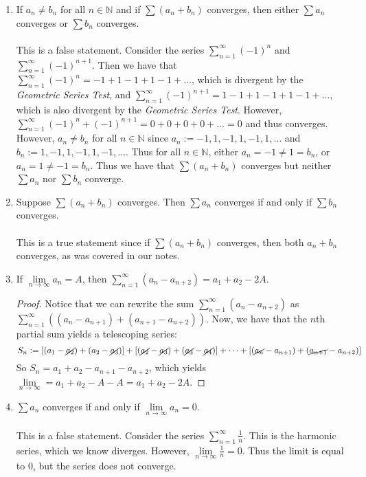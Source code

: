 \documentclass[12pt,letterpaper]{article}
\newcommand{\limx}[2]{\displaystyle\lim\limits_{#1 \to #2}}
\newcommand{\N}{\mathbb{N}}
\theoremstyle{case}
\theoremstyle{definition}
\begin{document}
\begin{enumerate}
\begin{enumerate}
			\item If $a_n \neq b_n$ for all $n \in \N$ and if $\sum (a_n+b_n)$ converges, then either $\sum a_n$ converges or $\sum b_n$ converges.
			\\\\This is a false statement. Consider the series $\displaystyle\sum_{n=1}^{\infty} (-1)^n$ and $\displaystyle\sum_{n=1}^{\infty} (-1)^{n+1}$. Then we have that $\displaystyle\sum_{n=1}^{\infty} (-1)^n = -1+1-1+1-1+\dots$, which is divergent by the \textit{Geometric Series Test}, and $\displaystyle\sum_{n=1}^{\infty} (-1)^{n+1} = 1-1+1-1+1-1+\dots$, which is also divergent by the \textit{Geometric Series Test}. However, $\displaystyle\sum_{n=1}^{\infty} (-1)^n+(-1)^{n+1} = 0+0+0+0+\dots = 0$ and thus converges. However, $a_n \neq b_n$ for all $n \in \N$ since
			$a_n:= -1,1,-1,1,-1,1,\dots$ and $b_n:=1,-1,1,-1,1,-1,\dots$. Thus for all $n \in \N$, either $a_n=-1 \neq 1 = b_n$, or $a_n=1\neq -1=b_n$. Thus we have that $\sum (a_n+b_n)$ converges but neither $\sum a_n$ nor $\sum b_n$ converge.\\
			
			\item Suppose $\sum (a_n+b_n)$ converges. Then $\sum a_n$ converges if and only if $\sum b_n$ converges. 
			\\\\This is a true statement since if $\sum (a_n+b_n)$ converges, then both $a_n+b_n$ converges, as was covered in our notes.\\
			
			\item If $\limx{n}{\infty} a_n=A$, then $\displaystyle\sum_{n=1}^{\infty} (a_n-a_{n+2})=a_1+a_2-2A$.
			\begin{proof}
				Notice that we can rewrite the sum $\displaystyle\sum_{n=1}^{\infty} (a_n-a_{n+2})$ as $\displaystyle\sum_{n=1}^{\infty} \left((a_n-a_{n+1})+(a_{n+1}-a_{n+2})\right)$. Now, we have that the $n$th partial sum yields a telescoping series:
				\[S_n:=[(a_1-\cancel{a_2})+(a_2-\cancel{a_3})]+ [(\cancel{a_2}-\cancel{a_3})+(\cancel{a_3}-\cancel{a_4})] + \dots + [(\cancel{a_n}-a_{n+1})+(\cancel{a_{n+1}}-a_{n+2})]\]
				So $S_n=a_1+a_2-a_{n+1}-a_{n+2}$, which yields $\limx{n}{\infty} =a_1+a_2-A-A=a_1+a_2-2A$.
			\end{proof}
			
			\item $\sum a_n$ converges if and only if $\limx{n}{\infty} a_n=0$.
			\\\\This is a false statement. Consider the series $\displaystyle\sum_{n=1}^{\infty} \frac{1}{n}$. This is the harmonic series, which we know diverges. However, $\limx{n}{\infty} \frac{1}{n} = 0$. Thus the limit is equal to 0, but the series does not converge.\\
			

\end{enumerate}
\end{enumerate}
\end{document}
